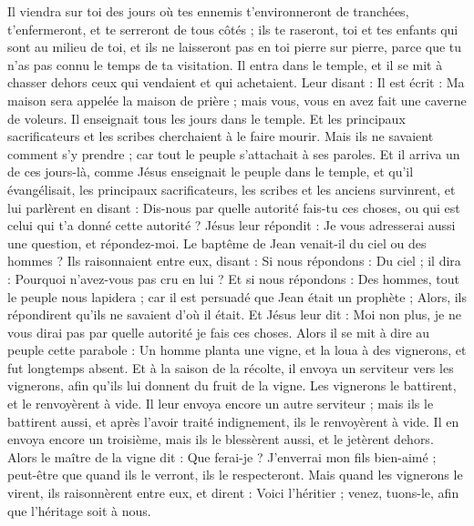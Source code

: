 \begin{multicols}{2}
Il viendra sur toi des jours où tes ennemis t'environneront de tranchées, t'enfermeront, et te serreront de tous côtés ;
ils te raseront, toi et tes enfants qui sont au milieu de toi, et ils ne laisseront pas en toi pierre sur pierre, parce que tu n'as pas connu le temps de ta visitation.
Il entra dans le temple, et il se mit à chasser dehors ceux qui vendaient et qui achetaient.
Leur disant : Il est écrit : Ma maison sera appelée la maison de prière ; mais vous, vous en avez fait une caverne de voleurs.
Il enseignait tous les jours dans le temple. Et les principaux sacrificateurs et les scribes cherchaient à le faire mourir.
Mais ils ne savaient comment s'y prendre ; car tout le peuple s'attachait à ses paroles.
\VerseOne{}Et il arriva un de ces jours-là, comme Jésus enseignait le peuple dans le temple, et qu'il évangélisait, les principaux sacrificateurs, les scribes et les anciens survinrent,
et lui parlèrent en disant : Dis-nous par quelle autorité fais-tu ces choses, ou qui est celui qui t'a donné cette autorité ?
Jésus leur répondit : Je vous adresserai aussi une question, et répondez-moi.
Le baptême de Jean venait-il du ciel ou des hommes ?
Ils raisonnaient entre eux, disant : Si nous répondons : Du ciel ; il dira : Pourquoi n'avez-vous pas cru en lui ?
Et si nous répondons : Des hommes, tout le peuple nous lapidera ; car il est persuadé que Jean était un prophète ;
Alors, ils répondirent qu'ils ne savaient d'où il était.
Et Jésus leur dit : Moi non plus, je ne vous dirai pas par quelle autorité je fais ces choses.
Alors il se mit à dire au peuple cette parabole : Un homme planta une vigne, et la loua à des vignerons, et fut longtemps absent.
Et à la saison de la récolte, il envoya un serviteur vers les vignerons, afin qu'ils lui donnent du fruit de la vigne. Les vignerons le battirent, et le renvoyèrent à vide.
Il leur envoya encore un autre serviteur ; mais ils le battirent aussi, et après l'avoir traité indignement, ils le renvoyèrent à vide.
Il en envoya encore un troisième, mais ils le blessèrent aussi, et le jetèrent dehors.
Alors le maître de la vigne dit : Que ferai-je ? J'enverrai mon fils bien-aimé ; peut-être que quand ils le verront, ils le respecteront.
Mais quand les vignerons le virent, ils raisonnèrent entre eux, et dirent : Voici l'héritier ; venez, tuons-le, afin que l'héritage soit à nous.

\end{multicols}

